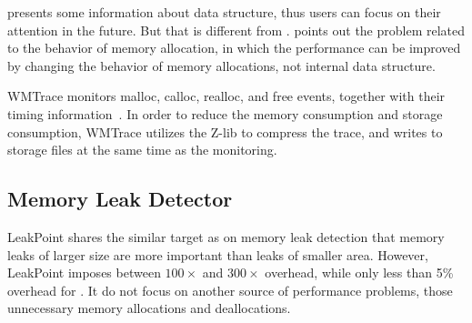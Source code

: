 \MP{} presents some information about data structure, thus users can focus on their attention in the future. But that is different from \MP{}. \MP{} points out the problem related to the behavior of memory allocation, in which the performance can be improved by changing the behavior of memory allocations, not internal data structure. 
  


\cite{846583}

\cite{1190248}



WMTrace monitors malloc, calloc, realloc, and free events, together with their timing information~\cite{Perks:2011:WAP:2186355.2186369}. In order to reduce the memory consumption and storage consumption, WMTrace utilizes the Z-lib to compress the trace, and writes to storage files at the same time as the monitoring. 
 

\subsection{Memory Leak Detector}

LeakPoint\cite{Clause:2010:LPC:1806799.1806874} shares the similar target as \MP{} on memory leak detection that memory leaks of larger size
are more important than leaks of smaller area. However, LeakPoint imposes between $100\times$ and $300\times$ overhead, while only less than 5\% overhead for \MP{}. It do not focus on another source of performance problems, those unnecessary memory allocations and deallocations. 

